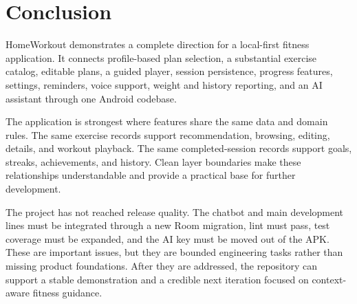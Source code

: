 \section{Conclusion}

HomeWorkout demonstrates a complete direction for a local-first fitness application. It connects profile-based plan selection, a substantial exercise catalog, editable plans, a guided player, session persistence, progress features, settings, reminders, voice support, weight and history reporting, and an AI assistant through one Android codebase.

The application is strongest where features share the same data and domain rules. The same exercise records support recommendation, browsing, editing, details, and workout playback. The same completed-session records support goals, streaks, achievements, and history. Clean layer boundaries make these relationships understandable and provide a practical base for further development.

The project has not reached release quality. The chatbot and main development lines must be integrated through a new Room migration, lint must pass, test coverage must be expanded, and the AI key must be moved out of the APK. These are important issues, but they are bounded engineering tasks rather than missing product foundations. After they are addressed, the repository can support a stable demonstration and a credible next iteration focused on context-aware fitness guidance.
